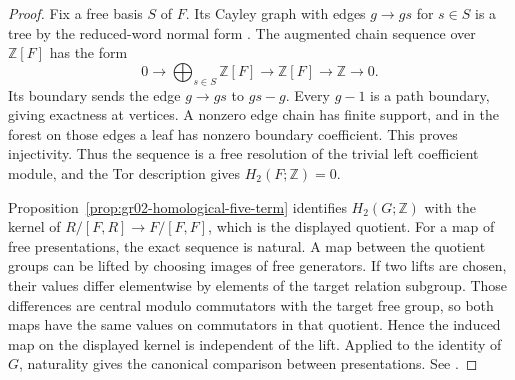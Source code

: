 \documentclass[11pt,oneside,openany]{book}
\theoremstyle{definition}
\theoremstyle{remark}
\begin{document}
\begin{proof}
Fix a free basis \(S\) of \(F\). Its Cayley graph with edges
\(g\to gs\) for \(s\in S\) is a tree by the reduced-word normal
form \cite[K07.01.free\_group\_universal\_property]{d07}.
The augmented chain sequence
over \(\mathbb Z[F]\) has the form
\[
 0\to \bigoplus_{s\in S}\mathbb Z[F]\to\mathbb Z[F]\to\mathbb Z\to0 .
\]
Its boundary sends the edge \(g\to gs\) to \(gs-g\).
Every \(g-1\) is a path boundary, giving exactness at vertices.
A nonzero edge chain has finite support, and in the forest on
those edges a leaf has nonzero boundary coefficient. This proves
injectivity. Thus the sequence is a free resolution of the
trivial left coefficient module, and the Tor description
\cite[A10]{homalg} gives \(H_2(F;\mathbb Z)=0\).

Proposition~\ref{prop:gr02-homological-five-term} identifies
\(H_2(G;\mathbb Z)\) with the kernel of \(R/[F,R]\to F/[F,F]\),
which is the displayed quotient. For a map of free presentations,
the exact sequence is natural. A map between the quotient groups
can be lifted by choosing images of free generators. If two lifts
are chosen, their values differ elementwise by elements of the
target relation subgroup. Those differences are central modulo
commutators with the target free group, so both maps have the
same values on commutators in that quotient. Hence the induced map
on the displayed kernel is independent of the lift. Applied to
the identity of \(G\), naturality gives the canonical comparison
between presentations. See \cite[Theorem 6.8.8]{weibel}.
\end{proof}
\end{document}
